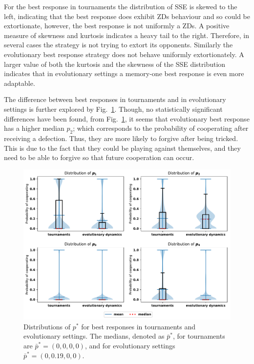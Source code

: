 \documentclass[9pt,twocolumn,twoside,lineno]{pnas-new}
\begin{document}
For the best response in tournaments the distribution of SSE is skewed to the
left, indicating that the best response does exhibit ZDs behaviour and so could
be extortionate,
however, the best response is not uniformly a ZDs. A positive measure of
skewness and kurtosis indicates a heavy tail to the right. Therefore, in several
cases the strategy is not trying to extort its opponents. Similarly the
evolutionary best response strategy does not behave uniformly extortionately. A
larger value of both the kurtosis and the skewness of the SSE distribution
indicates that in evolutionary settings a memory-one best response is even more
adaptable.

The difference between best responses in tournaments and in evolutionary
settings is further explored by Fig.~\ref{fig:behaviour_violin_plots}.
Though, no statistically significant differences have been found, from
Fig.~\ref{fig:behaviour_violin_plots}, it seems that evolutionary best
response has a higher median $p_2$; which corresponds to the probability of cooperating
after receiving a defection. Thus, they are more likely to forgive after
being tricked. This is due to the fact that they could be playing against
themselves, and they need to be able to forgive so that future cooperation can
occur.

\begin{table}
\begin{center}
\end{center}
\caption{SSE of best response memory-one when \(N=2\)}\label{table:sserror_stats}
\end{table}

\begin{figure}[!htbp]
        \includegraphics[width=.45\textwidth]{behaviour_violin_plots.pdf}
        \caption{Distributions of \(p^*\) for best responses in tournaments and
        evolutionary settings. The medians, denoted as \(\bar{p}^*\), for tournaments
        are \(\bar{p}^* = (0, 0, 0, 0)\), and for evolutionary settings
        \(\bar{p}^* = (0, 0.19, 0, 0)\).}
        \label{fig:behaviour_violin_plots}
\end{figure}
\end{document}
